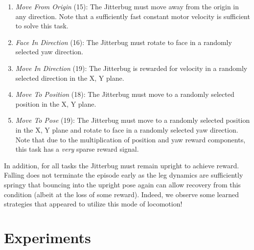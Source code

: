 \documentclass[letterpaper, 10 pt, conference]{ieeeconf}
\begin{document}
\begin{enumerate}[topsep=8pt, partopsep=0pt]
    
    \item \emph{Move From Origin} (15): The Jitterbug must move away from the origin in any direction.
    Note that a sufficiently fast constant motor velocity is sufficient to solve this task.
    
    \item \emph{Face In Direction} (16): The Jitterbug must rotate to face in a randomly selected yaw direction.
    
    \item \emph{Move In Direction} (19): The Jitterbug is rewarded for velocity in a randomly selected direction in the X, Y plane.
    
    \item \emph{Move To Position} (18): The Jitterbug must move to a randomly selected position in the X, Y plane.
    
    \item \emph{Move To Pose} (19): The Jitterbug must move to a randomly selected position in the X, Y plane and rotate to face in a randomly selected yaw direction.
    Note that due to the multiplication of position and yaw reward components, this task has a \emph{very} sparse reward signal.
    
\end{enumerate}

In addition, for all tasks the Jitterbug must remain upright to achieve reward.
Falling does not terminate the episode early as the leg dynamics are sufficiently springy that bouncing into the upright pose again can allow recovery from this condition (albeit at the loss of some reward).
Indeed, we observe some learned strategies that appeared to utilize this mode of locomotion!

\section{Experiments}
\end{document}
